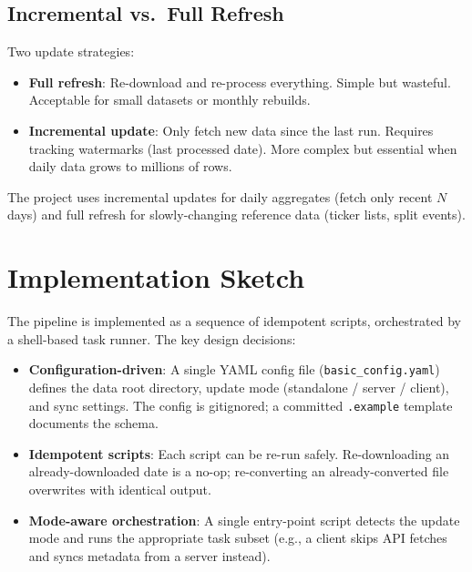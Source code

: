 \documentclass[a4paper, 11pt]{report}
\theoremstyle{definition}
\theoremstyle{remark}
\begin{document}
\subsection{Incremental vs.\ Full Refresh}

Two update strategies:

\begin{itemize}
    \item \textbf{Full refresh}: Re-download and re-process everything.  Simple
          but wasteful.  Acceptable for small datasets or monthly rebuilds.
    \item \textbf{Incremental update}: Only fetch new data since the last run.
          Requires tracking watermarks (last processed date).  More complex
          but essential when daily data grows to millions of rows.
\end{itemize}

The project uses incremental updates for daily aggregates (fetch only recent
$N$ days) and full refresh for slowly-changing reference data (ticker lists,
split events).

\section{Implementation Sketch}

The pipeline is implemented as a sequence of idempotent scripts, orchestrated by
a shell-based task runner.  The key design decisions:

\begin{itemize}
    \item \textbf{Configuration-driven}: A single YAML config file
          (\texttt{basic\_config.yaml}) defines the data root directory, update
          mode (standalone / server / client), and sync settings.  The config is
          gitignored; a committed \texttt{.example} template documents the schema.
    \item \textbf{Idempotent scripts}: Each script can be re-run safely.
          Re-downloading an already-downloaded date is a no-op; re-converting an
          already-converted file overwrites with identical output.
    \item \textbf{Mode-aware orchestration}: A single entry-point script
          detects the update mode and runs the appropriate task subset
          (e.g., a client skips API fetches and syncs metadata from a server
          instead).
\end{itemize}
\end{document}
